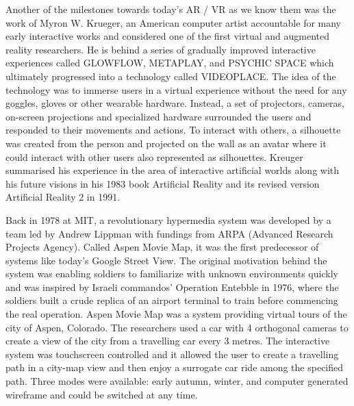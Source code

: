 \documentclass[12pt, a4paper]{article}
\begin{document}
Another of the milestones towards today’s AR / VR as we know them was the work of Myron W. Krueger, an American computer artist accountable for many early interactive works and considered one of the first virtual and augmented reality researchers. He is behind a series of gradually improved interactive experiences called GLOWFLOW, METAPLAY, and PSYCHIC SPACE which ultimately progressed into a technology called VIDEOPLACE. The idea of the technology was to immerse users in a virtual experience without the need for any goggles, gloves or other wearable hardware. Instead, a set of projectors, cameras, on-screen projections and specialized hardware surrounded the users and responded to their movements and actions. To interact with others, a silhouette was created from the person and projected on the wall as an avatar where it could interact with other users also represented as silhouettes. Kreuger summarised his experience in the area of interactive artificial worlds along with his future visions in his 1983 book Artificial Reality and its revised version Artificial Reality 2 in 1991.

Back in 1978 at MIT, a revolutionary hypermedia system was developed by a team led by Andrew Lippman with fundings from ARPA (Advanced Research Projects Agency). Called Aspen Movie Map, it was the first predecessor of systems like today’s Google Street View. The original motivation behind the system was enabling soldiers to familiarize with unknown environments quickly and was inspired by Israeli commandos’ Operation Entebble in 1976, where the soldiers built a crude replica of an airport terminal to train before commencing the real operation. Aspen Movie Map was a system providing virtual tours of the city of Aspen, Colorado. The researchers used a car with 4 orthogonal cameras to create a view of the city from a travelling car every 3 metres. The interactive system was touchscreen controlled and it allowed the user to create a travelling path in a city-map view and then enjoy a surrogate car ride among the specified path. Three modes were available: early autumn, winter, and computer generated wireframe and could be switched at any time.
\end{document}

